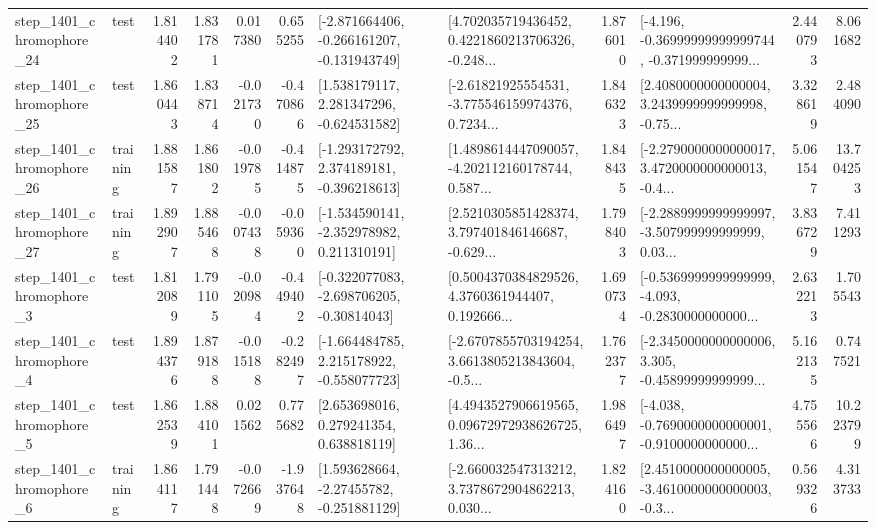 \begin{tabular}{llrrrrllrlrr}
 step\_1401\_chromophore\_24 &      test &      1.814402 &    1.831781 &      0.017380 &  0.655255 &  [-2.871664406, -0.266161207, -0.131943749] &  [4.702035719436452, 0.4221860213706326, -0.248... &       1.876010 &  [-4.196, -0.36999999999999744, -0.371999999999... &            2.440793 &          8.061682 \\
 step\_1401\_chromophore\_25 &      test &      1.860443 &    1.838714 &     -0.021730 & -0.470866 &    [1.538179117, 2.281347296, -0.624531582] &  [-2.61821925554531, -3.775546159974376, 0.7234... &       1.846323 &  [2.4080000000000004, 3.2439999999999998, -0.75... &            3.328619 &          2.484090 \\
 step\_1401\_chromophore\_26 &  training &      1.881587 &    1.861802 &     -0.019785 & -0.414875 &   [-1.293172792, 2.374189181, -0.396218613] &  [1.4898614447090057, -4.202112160178744, 0.587... &       1.848435 &  [-2.2790000000000017, 3.4720000000000013, -0.4... &            5.061547 &         13.704253 \\
 step\_1401\_chromophore\_27 &  training &      1.892907 &    1.885468 &     -0.007438 & -0.059360 &   [-1.534590141, -2.352978982, 0.211310191] &  [2.5210305851428374, 3.797401846146687, -0.629... &       1.798403 &  [-2.2889999999999997, -3.507999999999999, 0.03... &            3.836729 &          7.411293 \\
  step\_1401\_chromophore\_3 &      test &      1.812089 &    1.791105 &     -0.020984 & -0.449402 &   [-0.322077083, -2.698706205, -0.30814043] &  [0.5004370384829526, 4.3760361944407, 0.192666... &       1.690734 &  [-0.5369999999999999, -4.093, -0.2830000000000... &            2.632213 &          1.705543 \\
  step\_1401\_chromophore\_4 &      test &      1.894376 &    1.879188 &     -0.015188 & -0.282497 &   [-1.664484785, 2.215178922, -0.558077723] &  [-2.6707855703194254, 3.6613805213843604, -0.5... &       1.762377 &  [-2.3450000000000006, 3.305, -0.45899999999999... &            5.162135 &          0.747521 \\
  step\_1401\_chromophore\_5 &      test &      1.862539 &    1.884101 &      0.021562 &  0.775682 &     [2.653698016, 0.279241354, 0.638818119] &  [4.4943527906619565, 0.09672972938626725, 1.36... &       1.986497 &  [-4.038, -0.7690000000000001, -0.9100000000000... &            4.755566 &         10.223799 \\
  step\_1401\_chromophore\_6 &  training &      1.864117 &    1.791448 &     -0.072669 & -1.937648 &    [1.593628664, -2.27455782, -0.251881129] &  [-2.660032547313212, 3.7378672904862213, 0.030... &       1.824160 &  [2.4510000000000005, -3.4610000000000003, -0.3... &            0.569326 &          4.313733 \\

\end{tabular}
